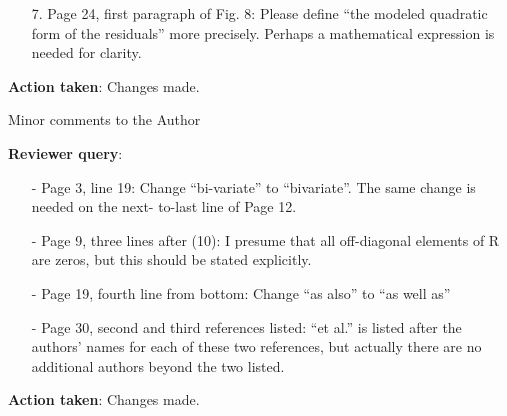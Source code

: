 \documentclass[a4paper]{article}
\def\reply{\textbf{Reviewer query}}
\def\action{\textbf{Action taken}}
\begin{document}
\begin{answers}
\begin{itemize}[noitemsep,topsep=0pt,parsep=0pt,partopsep=0pt]
\item[7.] Page 24, first paragraph of Fig. 8: Please define “the modeled quadratic form of the residuals”
more precisely. Perhaps a mathematical expression is needed for clarity.

\end{itemize}

\action: Changes made.

\item{Minor comments to the Author}\label{q31}

\reply: 
\begin{itemize}[noitemsep,topsep=0pt,parsep=0pt,partopsep=0pt]

\item[-] Page 3, line 19: Change “bi-variate” to “bivariate”. The same change is needed on the next-
to-last line of Page 12.

\item[-] Page 9, three lines after (10): I presume that all off-diagonal elements of R are zeros, but this
should be stated explicitly.

\item[-] Page 19, fourth line from bottom: Change “as also” to “as well as”

\item[-] Page 30, second and third references listed: “et al.” is listed after the authors’ names for each
of these two references, but actually there are no additional authors beyond the two listed.

\end{itemize}

\action: Changes made.

\end{answers}

\footnotesize



\end{document}
